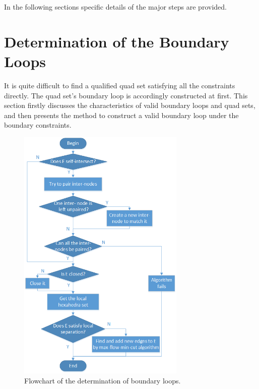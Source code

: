 \documentclass[final,5p,times,twocolumn]{elsarticle}
\begin{document}
In the following sections specific details of the major steps are provided.

\section{Determination of the Boundary Loops}
\label{sec:det_bound_loops}
It is quite difficult to find a qualified quad set satisfying all the constraints directly. The quad set's boundary loop is accordingly constructed at first. This section firstly discusses the characteristics of valid boundary loops and quad sets, and then presents the method to construct a valid boundary loop under the boundary constraints.

\begin{figure}[htbp]
\begin{center}
\includegraphics[width=8cm]{figures/flow_det_loop.png}
\caption{Flowchart of the determination of boundary loops.}
\label{fig:flow_det_loop}
\end{center}
\end{figure}
\end{document}
